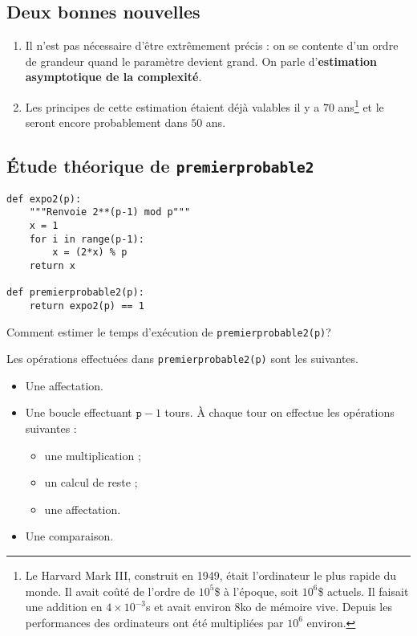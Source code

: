\subsection{Deux bonnes nouvelles}

\begin{enumerate}
\item Il n'est pas nécessaire d'être extrêmement précis : on se  contente d'un ordre de grandeur quand le paramètre devient grand. On
  parle d'\textbf{estimation asymptotique de la complexité}.
\item Les principes de cette estimation étaient déjà
  valables il y a $70$ ans\footnote{Le Harvard Mark III, construit en
    1949, était  l'ordinateur le plus rapide du
    monde. Il avait coûté de l'ordre de $10^{5}$\$ à l'époque, soit
    $10^{6}$\$ actuels. Il faisait une addition en $4\times 10^{-3}$s
    et avait environ $8$ko de mémoire vive. Depuis les performances
    des ordinateurs ont été multipliées par $10^{6}$ environ.} et le
  seront encore probablement dans $50$ ans.
\end{enumerate}

\subsection{Étude théorique de \texttt{premierprobable2}}

\begin{lstlisting}
def expo2(p):
    """Renvoie 2**(p-1) mod p"""
    x = 1
    for i in range(p-1):
        x = (2*x) % p
    return x  
    
def premierprobable2(p):
    return expo2(p) == 1
\end{lstlisting}

Comment estimer le temps d'exécution de \texttt{premierprobable2(p)}?

Les opérations effectuées dans \texttt{premierprobable2(p)} sont les suivantes.
\begin{itemize}
\item[\textbullet] Une affectation.
\item[\textbullet] Une boucle effectuant $\texttt{p}-1$ tours. À chaque tour on
  effectue les opérations suivantes :
  \begin{itemize}
  \item une multiplication ;
  \item un calcul de reste ;
  \item une affectation.
  \end{itemize}
\item[\textbullet] Une comparaison.
\end{itemize}

